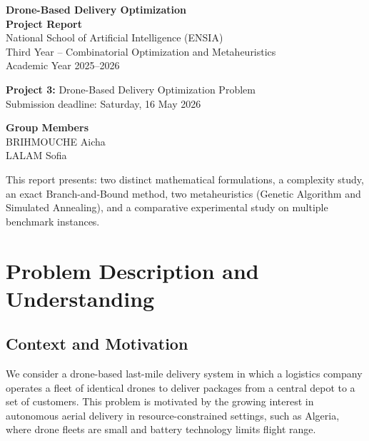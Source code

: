 \documentclass[12pt,a4paper]{article}
\begin{document}

\begin{titlepage}
  \centering
  \vspace*{2cm}
  {\huge\bfseries\color{deepblue} Drone-Based Delivery Optimization}\\[0.6em]
  {\large\bfseries Project Report}\\[2em]
  {\large National School of Artificial Intelligence (ENSIA)}\\[0.4em]
  {\large Third Year -- Combinatorial Optimization and Metaheuristics}\\[0.4em]
  {\large Academic Year 2025--2026}\\[4em]
  \begin{tcolorbox}[colback=lightblue,colframe=deepblue,width=0.85\textwidth]
    \centering
    \textbf{Project 3:} Drone-Based Delivery Optimization Problem\\[0.4em]
    Submission deadline: Saturday, 16 May 2026
  \end{tcolorbox}
  \vspace{2em}
  \begin{tcolorbox}[colback=boxgray,colframe=deepblue,width=0.6\textwidth]
    \centering
    \textbf{Group Members}\\[0.5em]
    BRIHMOUCHE Aicha\\
    LALAM Sofia
  \end{tcolorbox}
  \vfill
  {\small This report presents: two distinct mathematical formulations, a complexity study,
  an exact Branch-and-Bound method, two metaheuristics (Genetic Algorithm and Simulated
  Annealing), and a comparative experimental study on multiple benchmark instances.}
\end{titlepage}

\tableofcontents
\newpage

\section{Problem Description and Understanding}

\subsection{Context and Motivation}

We consider a drone-based last-mile delivery system in which a logistics company operates
a fleet of identical drones to deliver packages from a central depot to a set of customers.
This problem is motivated by the growing interest in autonomous aerial delivery in
resource-constrained settings, such as Algeria, where drone fleets are small and battery
technology limits flight range.
\end{document}
